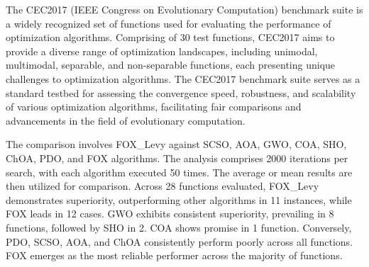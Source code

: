 \documentclass[
]{article}
\begin{document}
\begin{justify}
{The CEC2017 (IEEE Congress on Evolutionary Computation) benchmark suite is a widely recognized set of functions used for evaluating the performance of optimization algorithms. Comprising of 30 test functions, CEC2017 aims to provide a diverse range of optimization landscapes, including unimodal, multimodal, separable, and non-separable functions, each presenting unique challenges to optimization algorithms. The CEC2017 benchmark suite serves as a standard testbed for assessing the convergence speed, robustness, and scalability of various optimization algorithms, facilitating fair comparisons and advancements in the field of evolutionary computation.

The comparison involves FOX\_Levy against SCSO, AOA, GWO, COA, SHO, ChOA, PDO, and FOX algorithms. The analysis comprises 2000 iterations per search, with each algorithm executed 50 times. The average or mean results are then utilized for comparison. Across 28 functions evaluated, FOX\_Levy demonstrates superiority, outperforming other algorithms in 11 instances, while FOX leads in 12 cases. GWO exhibits consistent superiority, prevailing in 8 functions, followed by SHO in 2. COA shows promise in 1 function. Conversely, PDO, SCSO, AOA, and ChOA consistently perform poorly across all functions. FOX emerges as the most reliable performer across the majority of functions.


}
\end{justify}
\end{document}
